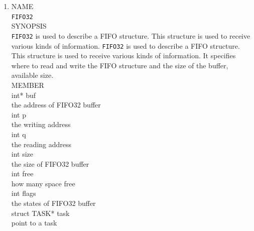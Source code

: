 \documentclass{swfcthesis}
\begin{document}
\begin{enumerate}
  \item
  NAME \\
  \hspace*{1cm}\texttt{FIFO32} \\
  SYNOPSIS \\
  \hspace*{1cm} \texttt{FIFO32} is used to describe a FIFO structure. This
structure is used to receive various kinds of information. \texttt{FIFO32} is used to
describe a FIFO structure. This structure is used to receive various kinds of
information. It specifies where to read and write the FIFO structure and the size of the
buffer, available size.\\
  MEMBER \\
  \hspace*{1cm} int* buf \\
  \hspace*{1.5cm}  the address of FIFO32 buffer \\
  \hspace*{1cm} int p \\
  \hspace*{1.5cm} the writing address \\
  \hspace*{1cm} int q\\
  \hspace*{1.5cm} the reading address \\
  \hspace*{1cm} int size\\
  \hspace*{1.5cm} the size of FIFO32 buffer \\
  \hspace*{1cm} int free \\
  \hspace*{1.5cm} how many space free\\
  \hspace*{1cm} int flags\\
  \hspace*{1.5cm}  the states of FIFO32 buffer\\
  \hspace*{1cm} struct TASK* task \\
  \hspace*{1.5cm} point to a task \\


\end{enumerate}
\end{document}
